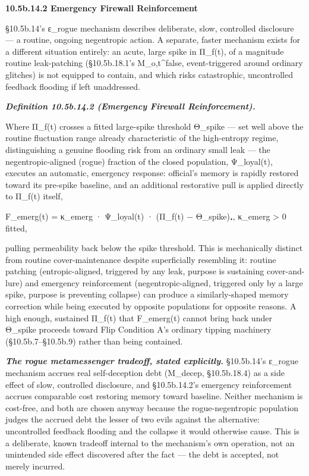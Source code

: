 \documentclass[
]{article}
\begin{document}
\textbf{10.5b.14.2 Emergency Firewall Reinforcement}

§10.5b.14's ε\_rogue mechanism describes deliberate, slow, controlled
disclosure --- a routine, ongoing negentropic action. A separate, faster
mechanism exists for a different situation entirely: an acute, large
spike in Π\_f(t), of a magnitude routine leak-patching (§10.5b.18.1's
M\_o,t\^{}false, event-triggered around ordinary glitches) is not
equipped to contain, and which risks catastrophic, uncontrolled feedback
flooding if left unaddressed.

\emph{\textbf{Definition 10.5b.14.2 (Emergency Firewall
Reinforcement).}}

Where Π\_f(t) crosses a fitted large-spike threshold Θ\_spike --- set
well above the routine fluctuation range already characteristic of the
high-entropy regime, distinguishing a genuine flooding risk from an
ordinary small leak --- the negentropic-aligned (rogue) fraction of the
closed population, Ψ\_loyal(t), executes an automatic, emergency
response: official's memory is rapidly restored toward its pre-spike
baseline, and an additional restorative pull is applied directly to
Π\_f(t) itself,

F\_emerg(t) = κ\_emerg · Ψ\_loyal(t) · (Π\_f(t) − Θ\_spike)₊, κ\_emerg
\textgreater{} 0 fitted,

pulling permeability back below the spike threshold. This is
mechanically distinct from routine cover-maintenance despite
superficially resembling it: routine patching (entropic-aligned,
triggered by any leak, purpose is sustaining cover-and-lure) and
emergency reinforcement (negentropic-aligned, triggered only by a large
spike, purpose is preventing collapse) can produce a similarly-shaped
memory correction while being executed by opposite populations for
opposite reasons. A high enough, sustained Π\_f(t) that F\_emerg(t)
cannot bring back under Θ\_spike proceeds toward Flip Condition A's
ordinary tipping machinery (§10.5b.7--§10.5b.9) rather than being
contained.

\emph{\textbf{The rogue metamessenger tradeoff, stated explicitly.}}
§10.5b.14's ε\_rogue mechanism accrues real self-deception debt
(M\_decep, §10.5b.18.4) as a side effect of slow, controlled disclosure,
and §10.5b.14.2's emergency reinforcement accrues comparable cost
restoring memory toward baseline. Neither mechanism is cost-free, and
both are chosen anyway because the rogue-negentropic population judges
the accrued debt the lesser of two evils against the alternative:
uncontrolled feedback flooding and the collapse it would otherwise
cause. This is a deliberate, known tradeoff internal to the mechanism's
own operation, not an unintended side effect discovered after the fact
--- the debt is accepted, not merely incurred.
\end{document}
